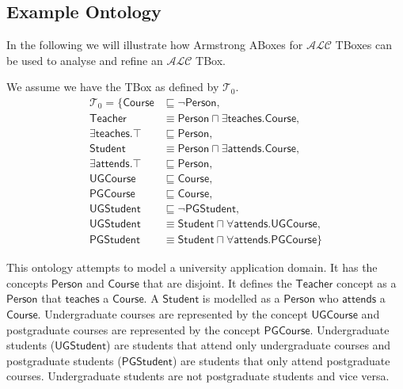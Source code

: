 \documentclass{amsart}
\begin{document}
  
  \subsection{Example Ontology}
  In the following we will illustrate how Armstrong ABoxes for $\mathcal{ALC}$ TBoxes can be used to analyse and refine an $\mathcal{ALC}$ TBox. 
  
  
  We assume we have the TBox as defined by $\mathcal{T}_0$. 
   \begin{align*}
  \mathcal{T}_0 = \{\mathsf{Course} &\sqsubseteq \neg \mathsf{Person},\\
  \mathsf{Teacher} &\equiv \mathsf{Person} \sqcap \exists\mathsf{teaches}.\mathsf{Course}, \\
  \exists\mathsf{teaches}.\top &\sqsubseteq \mathsf{Person},\\
  \mathsf{Student} &\equiv \mathsf{Person} \sqcap \exists\mathsf{attends}.\mathsf{Course}, \\
  \exists\mathsf{attends}.\top &\sqsubseteq \mathsf{Person},\\ 
  \mathsf{UGCourse} &\sqsubseteq \mathsf{Course},\\
  \mathsf{PGCourse} &\sqsubseteq \mathsf{Course},\\
   \mathsf{UGStudent} &\sqsubseteq \neg\mathsf{PGStudent},\\
  \mathsf{UGStudent} &\equiv\mathsf{Student} \sqcap  \forall\mathsf{attends}.\mathsf{UGCourse},\\
  \mathsf{PGStudent} &\equiv \mathsf{Student} \sqcap \forall\mathsf{attends}.\mathsf{PGCourse}\}
  \end{align*}  
  
This ontology attempts to model a university application domain. It has the concepts $\mathsf{Person}$ and $\mathsf{Course}$ that are disjoint. It defines the $\mathsf{Teacher}$ concept as a $\mathsf{Person}$ that $\mathsf{teaches}$ a $\mathsf{Course}$. A $\mathsf{Student}$ is modelled as a $\mathsf{Person}$ who $\mathsf{attends}$ a $\mathsf{Course}$. Undergraduate courses are represented by the concept $\mathsf{UGCourse}$ and postgraduate courses are represented by the concept $\mathsf{PGCourse}$. Undergraduate students ($\mathsf{UGStudent}$) are students that attend only undergraduate courses and postgraduate students ($\mathsf{PGStudent}$) are students that only attend postgraduate courses. Undergraduate students are not postgraduate students and vice versa.
\end{document}
